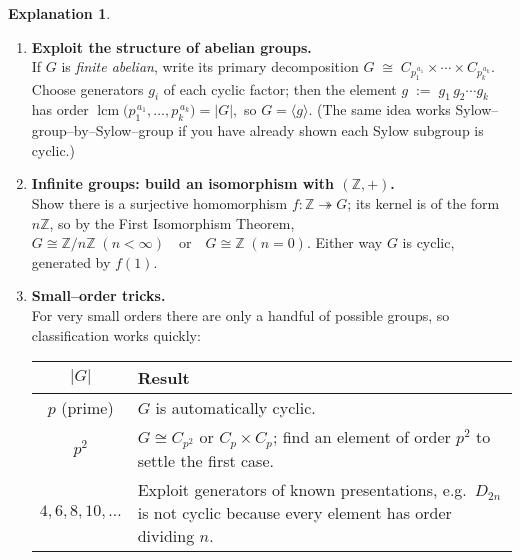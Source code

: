 \documentclass[12pt]{article}
\theoremstyle{definition} %
\newtheorem{explanation}{Explanation}
\theoremstyle{plain} %
\begin{document}
\begin{explanation}
\begin{enumerate}[label=\textbf{(\arabic*)},leftmargin=2.2em]
      \item \textbf{Exploit the structure of abelian groups.}\\
            If \(G\) is \emph{finite abelian}, write its primary
            decomposition
            \(
                G \;\cong\;
                C_{p_{1}^{\,a_{1}}}\times\cdots\times
                C_{p_{k}^{\,a_{k}}}.
            \)
            Choose generators \(g_{i}\) of each cyclic
            factor; then the element
            \(
                g \;:=\;
                g_{1}\,g_{2}\cdots g_{k}
            \)
            has order
            \(
                \operatorname{lcm}\bigl(
                      p_{1}^{\,a_{1}},\dots,p_{k}^{\,a_{k}}
                \bigr)=\lvert G\rvert,
            \)
            so \(G=\langle g\rangle\).
            (The same idea works Sylow–group–by–Sylow–group if you have
            already shown each Sylow subgroup is cyclic.)
    
      \item \textbf{Infinite groups:  build an isomorphism with
            \((\mathbb{Z},+)\).}\\
            Show there is a surjective homomorphism
            \(f:\mathbb{Z}\twoheadrightarrow G\);  
            its kernel is of the form \(n\mathbb{Z}\), so by the First
            Isomorphism Theorem,
            \(
               G\cong \mathbb{Z}/n\mathbb{Z}
               \;(n<\infty)
               \quad\text{or}\quad
               G\cong \mathbb{Z}
               \;(n=0).
            \)
            Either way \(G\) is cyclic, generated by \(f(1)\).
    
      \item \textbf{Small–order tricks.}\\
            For very small orders there are only a handful of possible
            groups, so classification works quickly:
    
            \begin{center}
            \begin{tabular}{c|l}
               \(\lvert G\rvert\) & Result\\\hline
               \(p\) (prime)      & \(G\) is automatically cyclic.\\
               \(p^{2}\)          & \(G\cong C_{p^{2}}\) or
                                    \(C_{p}\times C_{p}\);
                                    find an element of order \(p^{2}\) to
                                    settle the first case.\\
               \(4,6,8,10,\dots\) & Exploit generators of known
                                    presentations, e.g.\ \(D_{2n}\) is
                                    not cyclic because every element has
                                    order dividing \(n\).
            \end{tabular}
            \end{center}
    

\end{enumerate}
\end{explanation}
\end{document}
